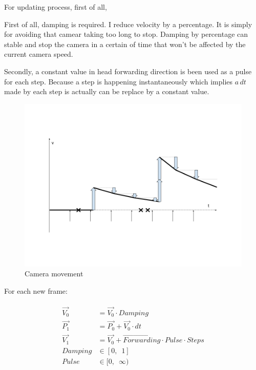 For updating process, first of all, 

First of all, damping is required. I reduce velocity by a percentage. It is simply for avoiding that camear taking too long to stop. Damping by percentage can stable and stop the camera in a certain of time that won't be affected by the current camera speed. 


Secondly, a constant value in head forwarding direction is been used as a pulse for each step. Because a step is happening instantaneously which implies $a\,dt$ made by each step is actually can be replace by a constant value.

\begin{figure}[H]
\caption[camera-movement]{Camera movement}
\label{fig:camera-movement}
\centering
\includegraphics[width=\linewidth]{Figures/camera-movement.png}
\decoRule
\end{figure}

For each new frame:

\[
\begin{array}{lr}
\begin{aligned}
\overrightarrow{V_0} &= \overrightarrow{V_0} \cdot Damping\\
\overrightarrow{P_1} &= \overrightarrow{P_0} + \overrightarrow{V_0} \cdot dt\\
\overrightarrow{V_1} &= \overrightarrow{V_0} + \overrightarrow{Forwarding} \cdot Pulse \cdot Steps\\
Damping &\in [0,\enspace1]\\
Pulse &\in [0,\enspace \infty)\\
\end{aligned}
\end{array}
\]

